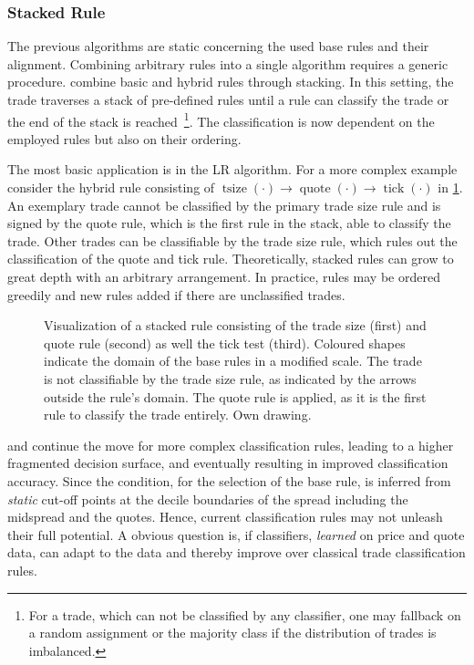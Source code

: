 \subsubsection{Stacked Rule}\label{sec:stacked-rule}

The previous algorithms are static concerning the used base rules and their alignment. Combining arbitrary rules into a single algorithm requires a generic procedure. \textcite[][18]{grauerOptionTradeClassification2022} combine basic and hybrid rules through stacking. In this setting, the trade traverses a stack of pre-defined rules until a rule can classify the trade or the end of the stack is reached~\footnote{For a trade, which can not be classified by any classifier, one may fallback on a random assignment or the majority class if the distribution of trades is imbalanced.}. The classification is now dependent on the employed rules but also on their ordering.

The most basic application is in the \gls{LR} algorithm. For a more complex example consider the hybrid rule consisting of $\operatorname{tsize}(\cdot) \to \operatorname{quote}(\cdot) \to \operatorname{tick}(\cdot)$ in \cref{fig:stacking-algo}. An exemplary trade cannot be classified by the primary trade size rule and is signed by the quote rule, which is the first rule in the stack, able to classify the trade. Other trades can be classifiable by the trade size rule, which rules out the classification of the quote and tick rule. Theoretically, stacked rules can grow to great depth with an arbitrary arrangement. In practice, rules may be ordered greedily and new rules added if there are unclassified trades.

\begin{figure}[ht!]
    \centering
    
    \caption[Visualization Of A Stacked Rule]{Visualization of a stacked rule consisting of the trade size (first) and quote rule (second) as well the tick test (third). Coloured shapes indicate the domain of the base rules in a modified scale. The trade is not classifiable by the trade size rule, as indicated by the arrows outside the rule's domain. The quote rule is applied, as it is the first rule to classify the trade entirely. Own drawing.}
    \label{fig:stacking-algo}
\end{figure}

\textcite[][3811]{chakrabartyTradeClassificationAlgorithms2007} and \textcite[][18]{grauerOptionTradeClassification2022} continue the move for more complex classification rules, leading to a higher fragmented decision surface, and eventually resulting in improved classification accuracy. Since the condition, for the selection of the base rule, is inferred from \emph{static} cut-off points at the decile boundaries of the spread including the midspread and the quotes. Hence, current classification rules may not unleash their full potential. A obvious question is, if classifiers, \emph{learned} on price and quote data, can adapt to the data and thereby improve over classical trade classification rules.

